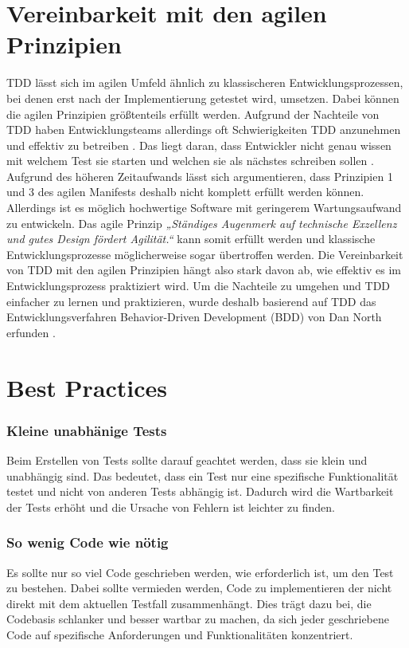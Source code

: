 \documentclass[a0,landscape]{a0poster}
\begin{document}
\begin{multicols}{4}
\section*{Vereinbarkeit mit den agilen Prinzipien}
TDD lässt sich im agilen Umfeld ähnlich zu klassischeren Entwicklungsprozessen, bei denen erst nach der Implementierung getestet wird, umsetzen. Dabei können die agilen Prinzipien größtenteils erfüllt werden.
\newline 
Aufgrund der Nachteile von TDD haben Entwicklungsteams allerdings oft Schwierigkeiten TDD anzunehmen und effektiv zu betreiben \cite{smart2023bdd}.  
Das liegt daran, dass Entwickler nicht genau wissen mit welchem Test sie starten und welchen sie als nächstes schreiben sollen \cite{smart2023bdd}. 
\newline 
Aufgrund des höheren Zeitaufwands lässt sich argumentieren, dass Prinzipien 1 und 3 des agilen Manifests deshalb nicht komplett erfüllt werden können.
\newline 
Allerdings ist es möglich hochwertige Software mit geringerem Wartungsaufwand zu entwickeln. Das agile Prinzip \textit{„Ständiges Augenmerk auf technische Exzellenz und gutes Design fördert Agilität.“} kann somit erfüllt werden und klassische Entwicklungsprozesse möglicherweise sogar übertroffen werden.
\newline 
Die Vereinbarkeit von TDD mit den agilen Prinzipien hängt also stark davon ab, wie effektiv es im Entwicklungsprozess praktiziert wird.
\newline 
Um die Nachteile zu umgehen und TDD einfacher zu lernen und praktizieren, wurde deshalb basierend auf TDD das Entwicklungsverfahren Behavior-Driven Development (BDD) von Dan North erfunden \cite{smart2023bdd}.


\section*{Best Practices}

\subsubsection*{Kleine unabhänige Tests}
Beim Erstellen von Tests sollte darauf geachtet werden, dass sie klein und unabhängig sind. Das bedeutet, dass ein Test nur eine spezifische Funktionalität testet und nicht von anderen Tests abhängig ist. Dadurch wird die Wartbarkeit der Tests erhöht und die Ursache von Fehlern ist leichter zu finden.

\subsubsection*{So wenig Code wie nötig}
Es sollte nur so viel Code geschrieben werden, wie erforderlich ist, um den Test zu bestehen. Dabei sollte vermieden werden, Code zu implementieren der nicht direkt mit dem aktuellen Testfall zusammenhängt. Dies trägt dazu bei, die Codebasis schlanker und besser wartbar zu machen, da sich jeder geschriebene Code auf spezifische Anforderungen und Funktionalitäten konzentriert.


\end{multicols}
\end{document}
